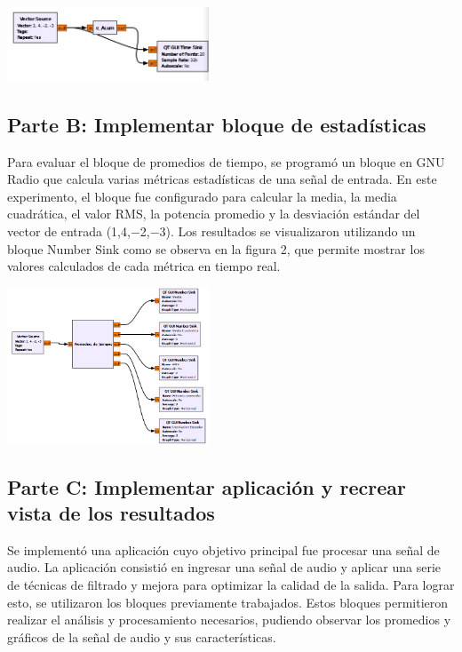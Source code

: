 \documentclass{journal}[IEEEtran, twocolumn]             %
\begin{document}
\begin{multicols}{2}
    \begin{center}
    \includegraphics[width=0.45\textwidth]{figs/F1.png}
    \caption{Figura 1: Diagrama de flujo}
    \end{center}


\subsection{Parte B: Implementar bloque de estadísticas}

    Para evaluar el bloque de promedios de tiempo, se programó un bloque en GNU Radio que calcula varias métricas estadísticas de una señal de entrada. En este experimento, el bloque fue configurado para calcular la media, la media cuadrática, el valor RMS, la potencia promedio y la desviación estándar del vector de entrada (1,4,−2,−3). Los resultados se visualizaron utilizando un bloque Number Sink como se observa en la figura 2, que permite mostrar los valores calculados de cada métrica en tiempo real.
    
        \begin{center}
        \includegraphics[width=0.45\textwidth]{figs/F4.png}
        \caption{Figura 2: Diagrama de flujo}
        \end{center}



\subsection{Parte C: Implementar aplicación y recrear vista de los resultados}
Se implementó una aplicación cuyo objetivo principal fue procesar una señal de audio. La aplicación consistió en ingresar una señal de audio y aplicar una serie de técnicas de filtrado y mejora para optimizar la calidad de la salida. Para lograr esto, se utilizaron los bloques previamente trabajados. Estos bloques permitieron realizar el análisis y procesamiento necesarios, pudiendo observar los promedios y gráficos de la señal de audio y sus características.


\end{multicols}
\end{document}
